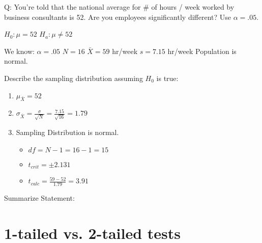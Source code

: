 \documentclass[11pt]{report}
\begin{document}
{
    Q: You're told that the national average for \# of hours / week worked by business consultants is 52. Are you employees significantly different? Use $\alpha = .05$. \newline

    $H_0: \mu = 52$ \newline
    $H_a: \mu \neq 52$ \newline

    We know: \newline
    $\alpha = .05$ \newline
    $N = 16$ \newline
    $\bar{X} = 59$ hr/week \newline
    $s = 7.15$ hr/week \newline 
    Population is normal. \newline

    Describe the sampling distribution assuming $H_0$ is true: \newline 
    \begin{enumerate}
        \item $\mu_{\bar{X}} = 52$ 
        \item $\sigma_{\bar{X}} = \frac{\sigma}{\sqrt{N}} = \frac{7.15}{\sqrt{16}} = 1.79$ 
        \item Sampling Distribution is normal. 
        \begin{itemize}
            \item $df = N - 1 = 16 -1 = 15$
            \item $t_{crit} = \pm 2.131$
            \item $t_{calc} = \frac{59 - 52}{1.79} = 3.91$
        \end{itemize}
    \end{enumerate}

    Summarize Statement: 
}

\section{1-tailed vs. 2-tailed tests}
\end{document}
